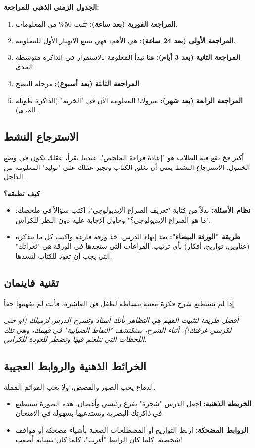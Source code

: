 \documentclass[12pt,a4paper]{book}
\newcommand{\quoteAr}[1]{%
	\begin{myquote}
		\itshape #1
	\end{myquote}
}
\begin{document}
	\textbf{الجدول الزمني الذهبي للمراجعة:}
	\begin{enumerate}
		\item \textbf{المراجعة الفورية (بعد ساعة):} تثبت 50\% من المعلومات.
		\item \textbf{المراجعة الأولى (بعد 24 ساعة):} هي الأهم، فهي تمنع الانهيار الأول للمعلومة.
		\item \textbf{المراجعة الثانية (بعد 3 أيام):} هنا تبدأ المعلومة بالاستقرار في الذاكرة متوسطة المدى.
		\item \textbf{المراجعة الثالثة (بعد أسبوع):} مرحلة النضج.
		\item \textbf{المراجعة الرابعة (بعد شهر):} مبروك! المعلومة الآن في "الخزنة" (الذاكرة طويلة المدى).
	\end{enumerate}
	
	\subsection{ الاسترجاع النشط }
	أكبر فخ يقع فيه الطلاب هو "إعادة قراءة الملخص". عندما تقرأ، عقلك يكون في وضع الخمول. الاسترجاع النشط يعني أن تغلق الكتاب وتجبر عقلك على "توليد" المعلومة من الداخل.
	
	\textbf{كيف تطبقه؟}
	\begin{itemize}
		\item \textbf{نظام الأسئلة:} بدلاً من كتابة "تعريف الصراع الإيديولوجي"، اكتب سؤالاً في ملخصك: "ما هو الصراع الإيديولوجي؟" وحاول الإجابة عليه دون النظر للكراس.
		\item \textbf{طريقة "الورقة البيضاء":} بعد إنهاء الدرس، خذ ورقة فارغة واكتب كل ما تتذكره (عناوين، تواريخ، أفكار) بأي ترتيب. الفراغات التي ستجدها في الورقة هي "ثغراتك" التي يجب أن تعود للكتاب لتسدها.
	\end{itemize}
	
	\subsection{ تقنية فاينمان  }
	إذا لم تستطيع شرح فكرة معينة ببساطة لطفل في العاشرة، فأنت لم تفهمها حقاً. 
	\quoteAr{أفضل طريقة لتثبيت الفهم هي التظاهر بأنك أستاذ وتشرح الدرس لزميلك (أو حتى لكرسي غرفتك!). أثناء الشرح، ستكتشف "النقاط الضبابية" في فهمك، وهي تلك اللحظات التي تتلعثم فيها وتضطر للعودة للكراس.}
	
	\subsection{ الخرائط الذهنية والروابط العجيبة}
	الدماغ يحب الصور والقصص، ولا يحب القوائم المملة.
	\begin{itemize}
		\item \textbf{الخريطة الذهنية:} اجعل الدرس "شجرة" بفرع رئيسي وأغصان. هذه الصورة ستنطبع في ذاكرتك البصرية وتستدعيها بسهولة في الامتحان.
		\item \textbf{الروابط المضحكة:} اربط التواريخ أو المصطلحات الصعبة بأشياء مضحكة أو مواقف شخصية. كلما كان الرابط "أغرب"، كلما كان نسيانه أصعب!
	\end{itemize}
	
\end{document}
